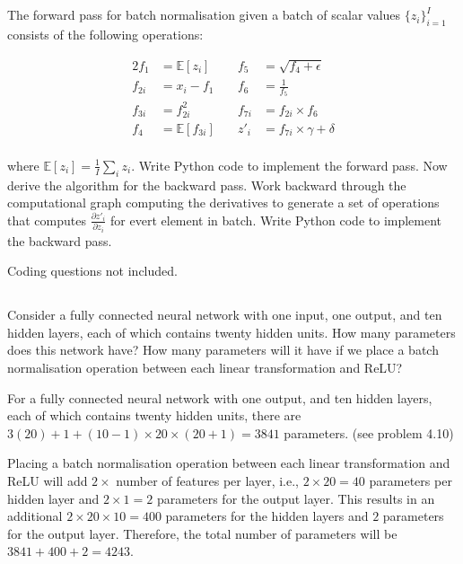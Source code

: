 \documentclass[12pt]{report}
\begin{document}
\subsection{}
\begin{mdframed}
    The forward pass for batch normalisation given a batch of scalar values $\{z_{i}\}^{I}_{i=1}$ consists of the following operations:

    \begin{alignat*}{2}
        f_{1}  & = \mathbb{E}[z_{i}]  & \quad f_{5}  & = \sqrt{f_{4}+\epsilon}         \\
        f_{2i} & = x_{i} - f_{1}      & \quad f_{6}  & = \frac{1}{f_{5}}               \\
        f_{3i} & = f_{2i}^{2}         & \quad f_{7i} & = f_{2i} \times f_{6}           \\
        f_{4}  & = \mathbb{E}[f_{3i}] & \quad z'_{i} & = f_{7i} \times \gamma + \delta \\
        \label{eq:11.10}
        \tag{11.10}
    \end{alignat*}

    where $\mathbb{E}[z_{i}] = \frac{1}{I}\sum_{i}z_{i}$. Write Python code to implement the forward pass. Now derive the algorithm for the backward pass. Work backward through the computational graph computing the derivatives to generate a set of operations that computes $\frac{\partial z'_{i}}{\partial z_{i}}$ for evert element in batch. Write Python code to implement the backward pass.
\end{mdframed}

Coding questions not included.


\subsection{}
\begin{mdframed}
    Consider a fully connected neural network with one input, one output, and ten hidden layers, each of which contains twenty hidden units. How many parameters does this network have? How many parameters will it have if we place a batch normalisation operation between each linear transformation and ReLU?
\end{mdframed}

For a fully connected neural network with one output, and ten hidden layers, each of which contains twenty hidden units, there are $3(20) + 1 +(10-1)\times 20 \times (20+1) = 3841$ parameters. (see problem 4.10)

Placing a batch normalisation operation between each linear transformation and ReLU will add $2 \times$ number of features per layer, i.e., $2 \times 20 = 40$ parameters per hidden layer and $2 \times 1 = 2$ parameters for the output layer. This results in an additional $2 \times 20 \times 10 = 400$ parameters for the hidden layers and $2$ parameters for the output layer. Therefore, the total number of parameters will be $3841 + 400 + 2 = 4243$.
\end{document}

